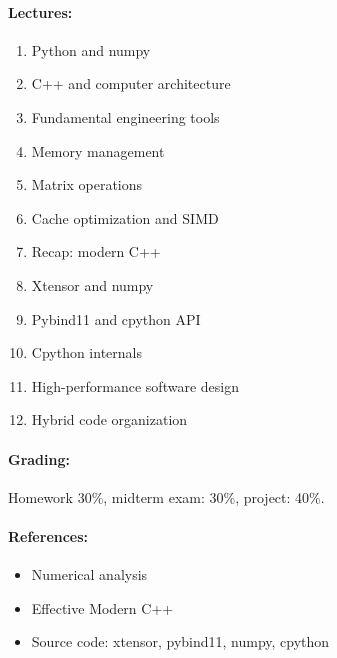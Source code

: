 \documentclass[11pt,a4paper]{article}
\begin{document}
\paragraph{Lectures:}
\begin{enumerate}
\item Python and numpy
\item C++ and computer architecture
\item Fundamental engineering tools
\item Memory management
\item Matrix operations
\item Cache optimization and SIMD
\item Recap: modern C++
\item Xtensor and numpy
\item Pybind11 and cpython API
\item Cpython internals
\item High-performance software design
\item Hybrid code organization
\end{enumerate}

\paragraph{Grading:} Homework 30\%, midterm exam: 30\%, project: 40\%.

\paragraph{References:}
\begin{itemize}
\item Numerical analysis
\item Effective Modern C++
\item Source code: xtensor, pybind11, numpy, cpython
\end{itemize}



\end{document}
